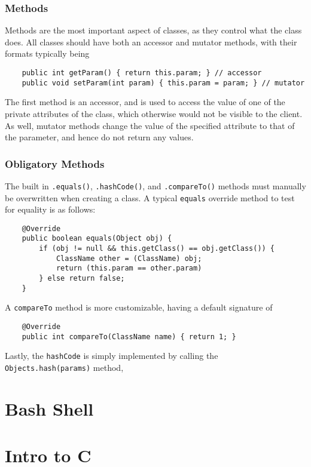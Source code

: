 \documentclass[oneside,11pt]{book}
\begin{document}
\subsection{Methods}

Methods are the most important aspect of classes, as they control what the class does. All classes should have both an accessor and mutator methods, with their formats typically being
\begin{verbatim}
    public int getParam() { return this.param; } // accessor
    public void setParam(int param) { this.param = param; } // mutator
\end{verbatim}
The first method is an accessor, and is used to access the value of one of the private attributes of the class, which otherwise would not be visible to the client. As well, mutator methods change the value of the specified attribute to that of the parameter, and hence do not return any values.

\subsection{Obligatory Methods}
The built in \verb$.equals()$, \verb$.hashCode()$, and \verb$.compareTo()$ methods must manually be overwritten when creating a class. A typical \verb$equals$ override method to test for equality is as follows:
\begin{verbatim}
    @Override
    public boolean equals(Object obj) {
        if (obj != null && this.getClass() == obj.getClass()) {
            ClassName other = (ClassName) obj;
            return (this.param == other.param)
        } else return false;
    }
\end{verbatim}
A \verb$compareTo$ method is more customizable, having a default signature of
\begin{verbatim}
    @Override
    public int compareTo(ClassName name) { return 1; }
\end{verbatim}
Lastly, the \verb$hashCode$ is simply implemented by calling the \texttt{Objects.hash(params)} method,

\chapter{Bash Shell}

\chapter{Intro to C}
\end{document}
